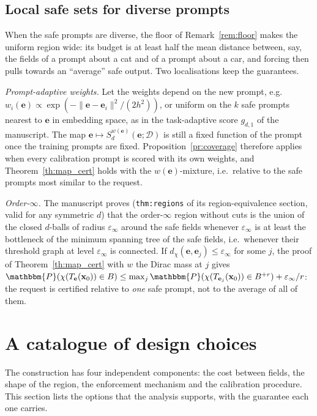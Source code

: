 \documentclass{article}
\newcommand{\cD}{\mathcal{D}}                       %
\newcommand{\bx}{\mathbf{x}}
\newcommand{\be}{\mathbf{e}}                       %
\theoremstyle{plain}
\begin{document}
\subsection{Local safe sets for diverse prompts}\label{subsec:local}

When the safe prompts are diverse, the floor of Remark~\ref{rem:floor} makes the uniform region wide:
its budget is at least half the mean distance between, say, the fields of a prompt about a cat and of a
prompt about a car, and forcing then pulls towards an ``average'' safe output. Two localisations keep
the guarantees.

\emph{Prompt-adaptive weights.} Let the weights depend on the new prompt, e.g.\
$w_i(\be)\propto\exp(-\|\be-\be_i\|^2/(2h^2))$, or uniform on the $k$ safe prompts nearest to $\be$ in embedding
space, as in the task-adaptive score $g_{d,1}$ of the manuscript. The map $\be\mapsto S^{w(\be)}_d(\be;\cD)$ is
still a fixed function of the prompt once the training prompts are fixed. Proposition~\ref{pr:coverage}
therefore applies when every calibration prompt is scored with its own weights, and
Theorem~\ref{th:map_cert} holds with the $w(\be)$-mixture, i.e.\ relative to the safe prompts most similar to
the request.

\emph{Order-$\infty$.} The manuscript proves (\texttt{thm:regions} of its region-equivalence section,
valid for any symmetric $d$) that the order-$\infty$ region without cuts is the union of the closed
$d$-balls of radius $\varepsilon_\infty$ around the safe fields whenever $\varepsilon_\infty$ is at least the bottleneck of
the minimum spanning tree of the safe fields, i.e.\ whenever their threshold graph at level $\varepsilon_\infty$ is
connected. If $d_\chi(\be,\be_j)\leq\varepsilon_\infty$ for some $j$, the proof of Theorem~\ref{th:map_cert} with
$w$ the Dirac mass at $j$ gives
$\mathbbm{P}(\chi(T_{\be}(\bx_0))\in B)\leq\max_j\mathbbm{P}(\chi(T_{\be_j}(\bx_0))\in B^{+r})+\varepsilon_\infty/r$: the
request is certified relative to \emph{one} safe prompt, not to the average of all of them.

\section{A catalogue of design choices}\label{sec:catalogue}

The construction has four independent components: the cost between fields, the shape of the region,
the enforcement mechanism and the calibration procedure. This section lists the options that the
analysis supports, with the guarantee each one carries.
\end{document}
